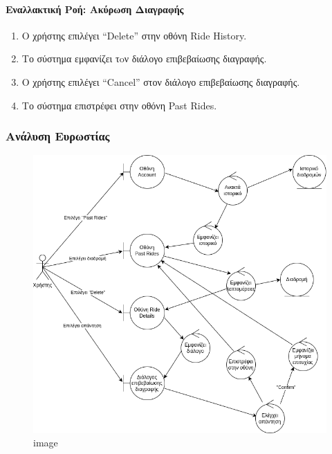 \hypertarget{ux3b5ux3bdux3b1ux3bbux3bbux3b1ux3baux3c4ux3b9ux3baux3ae-ux3c1ux3bfux3ae-ux3b1ux3baux3cdux3c1ux3c9ux3c3ux3b7-ux3b4ux3b9ux3b1ux3b3ux3c1ux3b1ux3c6ux3aeux3c2}{%
\paragraph{Εναλλακτική Ροή: Ακύρωση
Διαγραφής}\label{ux3b5ux3bdux3b1ux3bbux3bbux3b1ux3baux3c4ux3b9ux3baux3ae-ux3c1ux3bfux3ae-ux3b1ux3baux3cdux3c1ux3c9ux3c3ux3b7-ux3b4ux3b9ux3b1ux3b3ux3c1ux3b1ux3c6ux3aeux3c2}}

\begin{enumerate}
\def\labelenumi{\arabic{enumi}.}
\setcounter{enumi}{4}
\tightlist
\item
  Ο χρήστης επιλέγει ``Delete'' στην οθόνη Ride History.
\item
  Το σύστημα εμφανίζει τoν διάλογο επιβεβαίωσης διαγραφής.
\item
  Ο χρήστης επιλέγει ``Cancel'' στον διάλογο επιβεβαίωσης διαγραφής.
\item
  Το σύστημα επιστρέφει στην οθόνη Past Rides.
\end{enumerate}

\hypertarget{ux3b1ux3bdux3acux3bbux3c5ux3c3ux3b7-ux3b5ux3c5ux3c1ux3c9ux3c3ux3c4ux3afux3b1ux3c2}{%
\subsubsection{Ανάλυση
Ευρωστίας}\label{ux3b1ux3bdux3acux3bbux3c5ux3c3ux3b7-ux3b5ux3c5ux3c1ux3c9ux3c3ux3c4ux3afux3b1ux3c2}}

\begin{figure}
\centering
\includegraphics{./view-past-rides-robustness.drawio.png}
\caption{image}
\end{figure}
